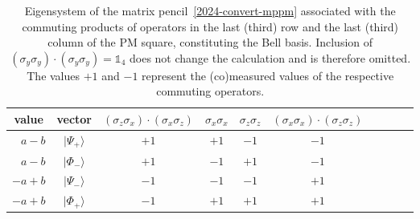 \documentclass[
  twocolumn,
 showpacs,
 showkeys,
 preprintnumbers,
 amsmath,amssymb,
 aps,
 pra,
  longbibliography,
 floatfix,
 ]{revtex4-2}
\newcommand\myotimes{ }
\begin{document}
\begin{table}[t]
\caption{\label{2024-convert-pm-es}Eigensystem of the matrix pencil~\eqref{2024-convert-mppm}
associated with the commuting  products of operators in the last (third) row and the last (third) column of the PM square,
constituting the Bell basis.
Inclusion of  $(\sigma_y \myotimes \sigma_y) \cdot (\sigma_y \myotimes \sigma_y) = \mathbb{1}_4$
does not change the calculation and is therefore omitted.
The values $+1$ and $-1$ represent the (co)measured values of the respective commuting operators.
}
\centering
\begin{ruledtabular}
\begin{tabular}{rccccccccc}
\multicolumn{1}{c}{value} &
\multicolumn{1}{c}{vector} &
$(\sigma_z \myotimes  \sigma_x) \cdot (\sigma_x\myotimes  \sigma_z)$ &
$\sigma_x \myotimes  \sigma_x$ &
$\sigma_z\myotimes  \sigma_z$ &
$(\sigma_x \myotimes  \sigma_x) \cdot  (\sigma_z\myotimes  \sigma_z)$
\\
\hline
   $a - b$ &          $ \vert \Psi_+ \rangle $   &   $+1$  &  $+1$    &  $-1$   &  $-1$      \\
   $a - b$ &          $ \vert \Phi_- \rangle $   &   $+1$  &  $-1$    &  $+1$   &  $-1$      \\
   $-a + b$ &         $ \vert \Psi_- \rangle $   &   $-1$  &  $-1$    &  $-1$   &  $+1$      \\
   $-a + b$ &         $ \vert \Phi_+ \rangle $   &   $-1$  &  $+1$    &  $+1$   &  $+1$      \\
\end{tabular}
\end{ruledtabular}
\end{table}


\end{document}
